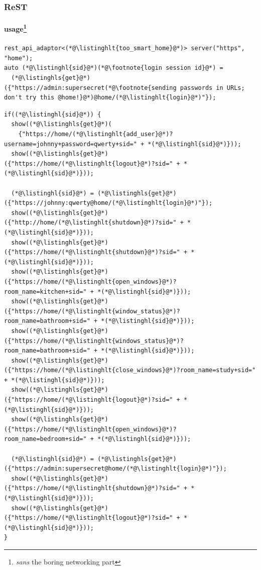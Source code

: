 \documentclass[compress,table,xcolor=table]{beamer}
\begin{document}
\begin{frame}[fragile]
  \frametitle{ReST}
  \framesubtitle{usage\footnote{{\em sans} the boring networking part}}
  \begin{lstlisting}[language=c++2x,basicstyle=\scriptsize\ttfamily]
rest_api_adaptor<(*@\listinghlt{too_smart_home}@*)> server("https", "home");
auto (*@\listinghl{sid}@*)(*@\footnote{login session id}@*) =
  (*@\listinghls{get}@*)({"https://admin:supersecret(*@\footnote{sending passwords in URLs; don't try this @home!}@*)@home/(*@\listinghlt{login}@*)"});
  \end{lstlisting}
  \begin{lstlisting}[language=c++2x,basicstyle=\tiny\ttfamily]
if((*@\listinghl{sid}@*)) {
  show((*@\listinghls{get}@*)(
    {"https://home/(*@\listinghlt{add_user}@*)?username=johnny+password=qwerty+sid=" + *(*@\listinghl{sid}@*)}));
  show((*@\listinghls{get}@*)({"https://home/(*@\listinghlt{logout}@*)?sid=" + *(*@\listinghl{sid}@*)}));

  (*@\listinghl{sid}@*) = (*@\listinghls{get}@*)({"https://johnny:qwerty@home/(*@\listinghlt{login}@*)"});
  show((*@\listinghls{get}@*)({"http://home/(*@\listinghlt{shutdown}@*)?sid=" + *(*@\listinghl{sid}@*)}));
  show((*@\listinghls{get}@*)({"https://home/(*@\listinghlt{shutdown}@*)?sid=" + *(*@\listinghl{sid}@*)}));
  show((*@\listinghls{get}@*)({"https://home/(*@\listinghlt{open_windows}@*)?room_name=kitchen+sid=" + *(*@\listinghl{sid}@*)}));
  show((*@\listinghls{get}@*)({"https://home/(*@\listinghlt{window_status}@*)?room_name=bathroom+sid=" + *(*@\listinghl{sid}@*)}));
  show((*@\listinghls{get}@*)({"https://home/(*@\listinghlt{windows_status}@*)?room_name=bathroom+sid=" + *(*@\listinghl{sid}@*)}));
  show((*@\listinghls{get}@*)({"https://home/(*@\listinghlt{close_windows}@*)?room_name=study+sid=" + *(*@\listinghl{sid}@*)}));
  show((*@\listinghls{get}@*)({"https://home/(*@\listinghlt{logout}@*)?sid=" + *(*@\listinghl{sid}@*)}));
  show((*@\listinghls{get}@*)({"https://home/(*@\listinghlt{open_windows}@*)?room_name=bedroom+sid=" + *(*@\listinghl{sid}@*)}));

  (*@\listinghl{sid}@*) = (*@\listinghls{get}@*)({"https://admin:supersecret@home/(*@\listinghlt{login}@*)"});
  show((*@\listinghls{get}@*)({"https://home/(*@\listinghlt{shutdown}@*)?sid=" + *(*@\listinghl{sid}@*)}));
  show((*@\listinghls{get}@*)({"https://home/(*@\listinghlt{logout}@*)?sid=" + *(*@\listinghl{sid}@*)}));
}
  \end{lstlisting}
\end{frame}
\end{document}
